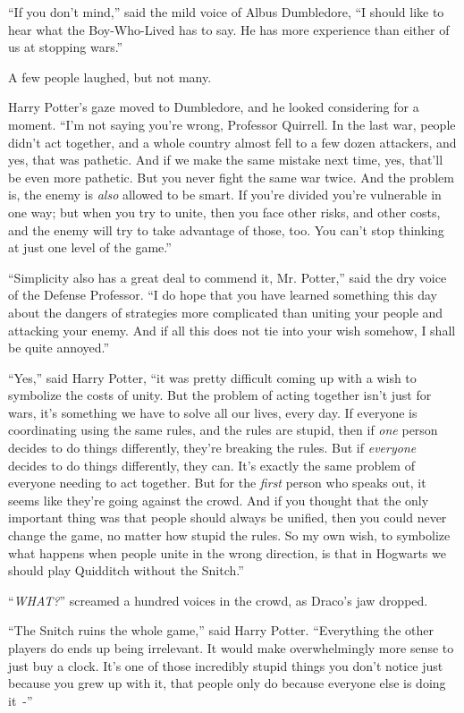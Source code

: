 ``If you don't mind,'' said the mild voice of Albus Dumbledore, ``I should like to hear what the Boy-Who-Lived has to say. He has more experience than either of us at stopping wars.''

A few people laughed, but not many.

Harry Potter's gaze moved to Dumbledore, and he looked considering for a moment. ``I'm not saying you're wrong, Professor Quirrell. In the last war, people didn't act together, and a whole country almost fell to a few dozen attackers, and yes, that was pathetic. And if we make the same mistake next time, yes, that'll be even more pathetic. But you never fight the same war twice. And the problem is, the enemy is \emph{also} allowed to be smart. If you're divided you're vulnerable in one way; but when you try to unite, then you face other risks, and other costs, and the enemy will try to take advantage of those, too. You can't stop thinking at just one level of the game.''

``Simplicity also has a great deal to commend it, Mr. Potter,'' said the dry voice of the Defense Professor. ``I do hope that you have learned something this day about the dangers of strategies more complicated than uniting your people and attacking your enemy. And if all this does not tie into your wish somehow, I shall be quite annoyed.''

``Yes,'' said Harry Potter, ``it was pretty difficult coming up with a wish to symbolize the costs of unity. But the problem of acting together isn't just for wars, it's something we have to solve all our lives, every day. If everyone is coordinating using the same rules, and the rules are stupid, then if \emph{one} person decides to do things differently, they're breaking the rules. But if \emph{everyone} decides to do things differently, they can. It's exactly the same problem of everyone needing to act together. But for the \emph{first} person who speaks out, it seems like they're going against the crowd. And if you thought that the only important thing was that people should always be unified, then you could never change the game, no matter how stupid the rules. So my own wish, to symbolize what happens when people unite in the wrong direction, is that in Hogwarts we should play Quidditch without the Snitch.''

``\emph{WHAT?}'' screamed a hundred voices in the crowd, as Draco's jaw dropped.

``The Snitch ruins the whole game,'' said Harry Potter. ``Everything the other players do ends up being irrelevant. It would make overwhelmingly more sense to just buy a clock. It's one of those incredibly stupid things you don't notice just because you grew up with it, that people only do because everyone else is doing it~-''

